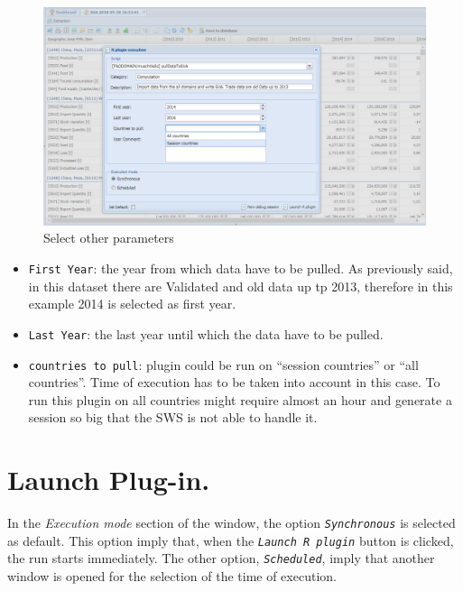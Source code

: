 \documentclass[]{article}
\providecommand{\tightlist}{%
  \setlength{\itemsep}{0pt}\setlength{\parskip}{0pt}}
\begin{document}
\begin{figure}[H]

{\centering \includegraphics[width=1\linewidth]{images/pullData/15_selectyearsCountries} 

}

\caption{\label{fig:f15}Select other parameters}\label{fig:f15}
\end{figure}

\begin{itemize}
\tightlist
\item
  \texttt{First\ Year}: the year from which data have to be pulled. As
  previously said, in this dataset there are Validated and old data up
  tp 2013, therefore in this example 2014 is selected as first year.
\item
  \texttt{Last\ Year}: the last year until which the data have to be
  pulled.
\item
  \texttt{countries\ to\ pull}: plugin could be run on ``session
  countries'' or ``all countries''. Time of execution has to be taken
  into account in this case. To run this plugin on all countries might
  require almost an hour and generate a session so big that the SWS is
  not able to handle it.
\end{itemize}

\section{Launch Plug-in.}\label{launch-plug-in.}

In the \emph{Execution mode} section of the window, the option
\emph{\texttt{Synchronous}} is selected as default. This option imply
that, when the \emph{\texttt{Launch\ R\ plugin}} button is clicked, the
run starts immediately. The other option, \emph{\texttt{Scheduled}},
imply that another window is opened for the selection of the time of
execution.
\end{document}
